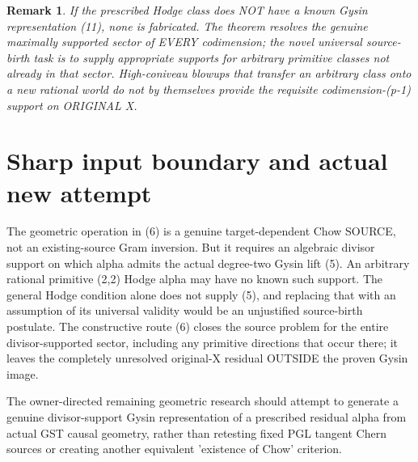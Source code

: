 \documentclass[11pt]{article}
\newtheorem{remark}[theorem]{Remark}
\begin{document}
\begin{remark}
If the prescribed Hodge
class does NOT have a known
Gysin representation (11),
none is fabricated.
The theorem resolves
the genuine maximally
supported sector of
EVERY codimension;
the novel universal
source-birth task is to
supply appropriate
supports for arbitrary
primitive classes not
already in that sector.
High-coniveau blowups
that transfer an
arbitrary class onto
a new rational world
do not by themselves
provide the requisite
codimension-(p-1)
support on ORIGINAL X.
\end{remark}

\section{Sharp input boundary and actual new attempt}
The geometric operation in (6) is a genuine
target-dependent Chow SOURCE, not an
existing-source Gram inversion. But it
requires an algebraic divisor support
on which alpha admits the actual
degree-two Gysin lift (5).
An arbitrary rational primitive
(2,2) Hodge alpha may have no
known such support. The general Hodge
condition alone does not supply (5),
and replacing that with an assumption
of its universal validity would be an
unjustified source-birth postulate.
The constructive route (6) closes
the source problem for the entire
divisor-supported sector, including
any primitive directions that occur
there; it leaves the completely
unresolved original-X residual OUTSIDE
the proven Gysin image.

The owner-directed remaining
geometric research should attempt
to generate a genuine divisor-support
Gysin representation of a prescribed
residual alpha from actual GST
causal geometry, rather than
retesting fixed PGL tangent Chern
sources or creating another
equivalent 'existence of Chow'
criterion.
\end{document}
